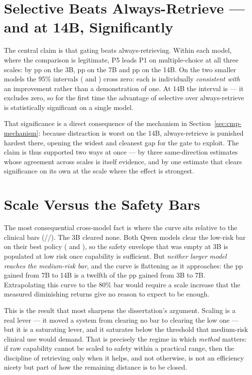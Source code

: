 \section{Selective Beats Always-Retrieve --- and at 14B, Significantly}
\label{sec:cmp-selective}

The central claim is that gating beats always-retrieving. Within each model,
where the comparison is legitimate, P5 leads P1 on multiple-choice at all three
scales: by \diffPfivePone{}pp on the 3B, \diffQwenPfivePone{}pp on the 7B and
\diffFourteenPfivePone{}pp on the 14B. On the two smaller models the 95\%
intervals (\diffPfivePoneCI{} and \diffQwenPfivePoneCI{}) cross zero: each is
individually \emph{consistent with} an improvement rather than a demonstration
of one. At 14B the interval is \diffFourteenPfivePoneCI{} --- it excludes zero,
so for the first time the advantage of selective over always-retrieve is
statistically significant on a single model.

That significance is a direct consequence of the mechanism in
Section~\ref{sec:cmp-mechanism}: because distraction is worst on the 14B,
always-retrieve is punished hardest there, opening the widest and cleanest gap
for the gate to exploit. The claim is thus supported two ways at once --- by
three same-direction estimates whose agreement across scales is itself evidence,
and by one estimate that clears significance on its own at the scale where the
effect is strongest.

\section{Scale Versus the Safety Bars}
\label{sec:cmp-bars}

The most consequential cross-model fact is where the curve sits relative to the
clinical bars (\barLow{}/\barMedium{}/\barHigh{}). The 3B cleared none. Both
Qwen models clear the \barLow{} low-risk bar on their best policy
(\accQwenPthreeMcq{} and \accQwenFourteenPthreeMcq{}), so the safety envelope
that was empty at 3B is populated at low risk once capability is sufficient. But
\emph{neither larger model reaches the \barMedium{} medium-risk bar}, and the
curve is flattening as it approaches: the \scaleGainLarge{}pp gained from 7B to
14B is a twelfth of the \scaleGainSmall{}pp gained from 3B to 7B. Extrapolating
this curve to the 80\% bar would require a scale increase that the measured
diminishing returns give no reason to expect to be enough.

This is the result that most sharpens the dissertation's argument. Scaling is a
real lever --- it moved a system from clearing no bar to clearing the low one
--- but it is a saturating lever, and it saturates below the threshold that
medium-risk clinical use would demand. That is precisely the regime in which
\emph{method} matters: if raw capability cannot be scaled to safety within a
practical range, then the discipline of retrieving only when it helps, and not
otherwise, is not an efficiency nicety but part of how the remaining distance is
to be closed.


